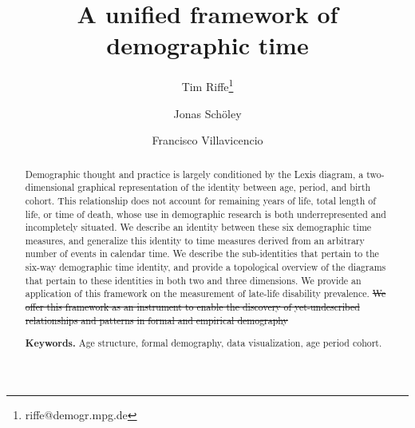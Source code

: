 \documentclass[12pt,oneside,a4paper]{article} %
\newcommand\ackn[1]{%
  \begingroup
  \renewcommand\thefootnote{}\footnote{#1}%
  \addtocounter{footnote}{-1}%
  \endgroup
}
\begin{document}
\title{A unified framework of demographic time}
\author[1]{Tim Riffe\thanks{riffe@demogr.mpg.de}}
\author[2,3]{Jonas Sch{\"o}ley}
\author[2,3]{Francisco Villavicencio}


\maketitle
\pagebreak
\begin{abstract}
Demographic thought and practice is largely conditioned by the Lexis diagram,
a two-dimensional graphical representation of the identity between age,
period, and birth cohort. This relationship does not account for remaining years
of life, total length of life, or time of death, whose use in
demographic research is both underrepresented and incompletely situated. We
describe an identity between these six demographic time measures, and generalize
this identity to time measures derived from an arbitrary number of events in
calendar time. We describe the sub-identities that pertain to the six-way
demographic time identity, and provide a topological overview of the diagrams that pertain to
these identities in both two and three dimensions. We provide an application of
this framework on the measurement of late-life disability prevalence. \st{We
offer this framework as an instrument to enable the discovery of yet-undescribed
relationships and patterns in formal and empirical demography}



\smallskip
\noindent \textbf{Keywords.} Age structure, formal demography, data
visualization, age period cohort.%
\end{abstract}

\end{document}
